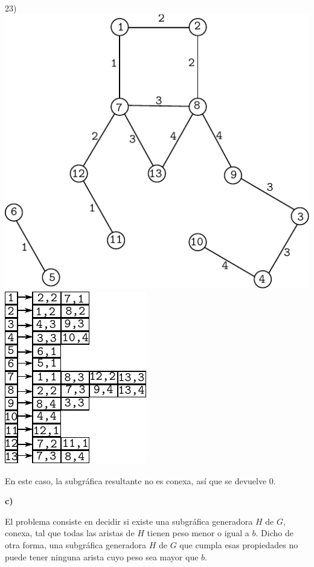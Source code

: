 \documentclass{article}
\begin{document}
\begin{center}
23)\includegraphics[scale=0.6]{bottleneck/g23}
\hspace{5mm}
\includegraphics[scale=0.9]{bottleneck/l23}
\end{center}

En este caso, la subgráfica resultante no es conexa, así que se devuelve 0.

\textbf{c)}

El problema consiste en decidir si existe una subgráfica generadora $H$ de $G$, conexa, tal que todas las aristas de $H$ tienen peso menor o igual a $b$. Dicho de otra forma, una subgráfica generadora $H$ de $G$ que cumpla esas propiedades no puede tener ninguna arista cuyo peso sea mayor que $b$.
\end{document}
